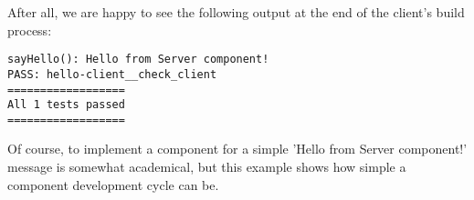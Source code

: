 \noindent
After all, we are happy to see the following output at the end of the client's
build process:

\begin{small}
\begin{verbatim}
sayHello(): Hello from Server component!
PASS: hello-client__check_client
==================
All 1 tests passed
==================
\end{verbatim}
\end{small}


\noindent
Of course, to implement a component for a simple 'Hello from Server component!'
message is somewhat academical, but this example shows how simple a component
development cycle can be. 



